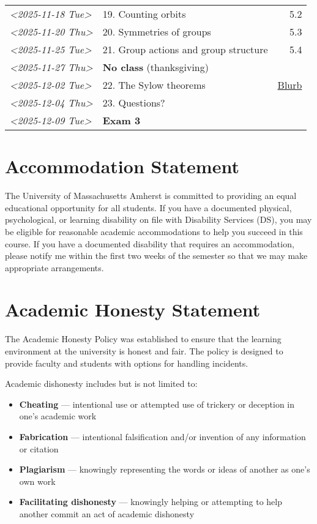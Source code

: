 \documentclass[11pt]{article}
\begin{document}
\begin{center}
\begin{tabular}{llr}
\textit{<2025-11-18 Tue>} & 19. Counting orbits & 5.2\\[0pt]
\textit{<2025-11-20 Thu>} & 20. Symmetries of groups & 5.3\\[0pt]
\textit{<2025-11-25 Tue>} & 21. Group actions and group structure & 5.4\\[0pt]
\textit{<2025-11-27 Thu>} & \textbf{No class} (thanksgiving) & \\[0pt]
\textit{<2025-12-02 Tue>} & 22. The Sylow theorems & \href{https://kconrad.math.uconn.edu/blurbs/grouptheory/sylowpf.pdf}{Blurb}\\[0pt]
\textit{<2025-12-04 Thu>} & 23. Questions? & \\[0pt]
\textit{<2025-12-09 Tue>} & \textbf{Exam 3} & \\[0pt]
\hline
\end{tabular}
\end{center}


\section{Accommodation Statement}
\label{sec:orgf68de26}

The University of Massachusetts Amherst is committed to providing an equal
educational opportunity for all students. If you have a documented physical,
psychological, or learning disability on file with Disability Services (DS),
you may be eligible for reasonable academic accommodations to help you succeed
in this course. If you have a documented disability that requires an
accommodation, please notify me within the first two weeks of the semester so
that we may make appropriate arrangements.

\section{Academic Honesty Statement}
\label{sec:org5f5f8e2}

The Academic Honesty Policy was established to ensure that the learning
environment at the university is honest and fair. The policy is designed to
provide faculty and students with options for handling incidents.

Academic dishonesty includes but is not limited to:

\begin{itemize}
\item \textbf{Cheating} — intentional use or attempted use of trickery or deception in one’s academic work
\item \textbf{Fabrication} — intentional falsification and/or invention of any information or citation
\item \textbf{Plagiarism} — knowingly representing the words or ideas of another as one’s own work
\item \textbf{Facilitating dishonesty} — knowingly helping or attempting to help another commit an act of academic dishonesty
\end{itemize}
\end{document}
